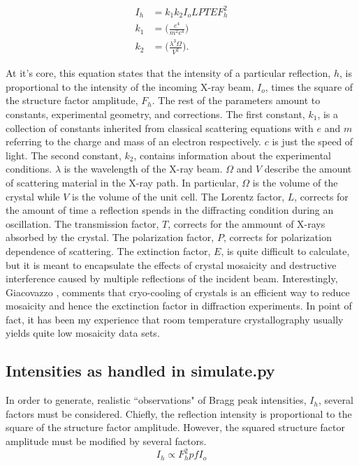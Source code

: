 \documentclass{report}
\begin{document}
\begin{align}
I_h &= k_1 k_2 I_o L P T E F_h^2 \nonumber \\
k_1 &= \bigg(\frac{e^4} {m^2c^4} \bigg) \nonumber \\ 
k_2 &= \bigg(\frac{\lambda^3 \Omega} {V^2} \bigg) .\nonumber
\end{align}

At it's core, this equation states that the intensity of a particular reflection, $h$, is proportional to the intensity of the incoming X-ray beam, $I_o$, times the square of the structure factor amplitude, $F_h$. 
The rest of the parameters amount to constants, experimental geometry, and corrections. 
The first constant, $k_1$, is a collection of constants inherited from classical scattering equations with $e$ and $m$ referring to the charge and mass of an electron respectively. $c$ is just the speed of light. 
The second constant, $k_2$, contains information about the experimental conditions. $\lambda$ is the wavelength of the X-ray beam. $\Omega$ and $V$ describe the amount of scattering material in the X-ray path. In particular, $\Omega$ is the volume of the crystal while $V$ is the volume of the unit cell. 
The Lorentz factor, $L$, corrects for the amount of time a reflection spends in the diffracting condition during an oscillation. 
The transmission factor, $T$, corrects for the ammount of X-rays absorbed by the crystal. 
The polarization factor, $P$, corrects for polarization dependence of scattering. 
The extinction factor, $E$, is quite difficult to calculate, but it is meant to encapsulate the effects of crystal mosaicity and destructive interference caused by multiple reflections of the incident beam. Interestingly, Giacovazzo \cite{Giacovazzo2011-wp}, comments that cryo-cooling of crystals is an efficient way to reduce mosaicity and hence the exctinction factor in diffraction experiments. In point of fact, it has been my experience that room temperature crystallography usually yields quite low mosaicity data sets. 


\subsection{Intensities as handled in simulate.py}
In order to generate, realistic ``observations" of Bragg peak intensities, $I_h$, several factors must be considered. 
Chiefly, the reflection intensity is proportional to the square of the structure factor amplitude. 
However, the squared structure factor amplitude must be modified by several factors. 
\begin{equation}
I_h \propto F_h^2pfI_o
\end{equation}
\end{document}
